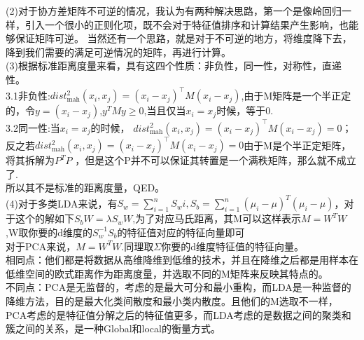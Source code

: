 \documentclass[answers]{exam}  %
\begin{document}
\begin{questions}
\begin{solution}
\begin{parts}
    (2)对于协方差矩阵不可逆的情况，我认为有两种解决思路，第一个是像岭回归一样，引入一个很小的正则化项，既不会对于特征值排序和计算结果产生影响，也能够保证矩阵可逆。
    当然还有一个思路，就是对于不可逆的地方，将维度降下去，降到我们需要的满足可逆情况的矩阵，再进行计算。\\
    
    (3)根据标准距离度量来看，具有这四个性质：非负性，同一性，对称性，直递性。\\
    3.1非负性:$dist_{\text{mah}}^2(x_i, x_j) = (x_i - x_j)^\top M (x_i - x_j)$,由于M矩阵是一个半正定的，令$y = (x_i - x_j)$,$y^T M y \geq 0$,当且仅当$x_i = x_j$时候，等于0.\\
    
    3.2同一性:当$x_i = x_j$的时候， $dist_{\text{mah}}^2(x_i, x_j) = (x_i - x_j)^\top M (x_i - x_j) = 0$；反之若$dist_{\text{mah}}^2(x_i, x_j) = (x_i - x_j)^\top M (x_i - x_j) = 0$由于M是个半正定矩阵，将其拆解为$P^TP$
    ，但是这个P并不可以保证其转置是一个满秩矩阵，那么就不成立了.\\
    
    所以其不是标准的距离度量，QED。\\
    (4)对于多类LDA来说，有$S_w = \sum_{i=1}^{n}S_wi, S_b = \sum_{i=1}^{n} (\mu_i - \mu)^T (\mu_i - \mu)$，对于这个的解如下$S_b W = \lambda S_w W$,为了对应马氏距离，其M可以这样表示$M = W^TW$,W取你要的d维度的$S_w^{-1}S_b$的特征值对应的特征向量即可\\
    对于PCA来说，$M = W^TW$.同理取$\Sigma$你要的d维度特征值的特征向量。\\
    相同点：他们都是将数据从高维降维到低维的技术，并且在降维之后都是用样本在低维空间的欧式距离作为距离度量，并选取不同的M矩阵来反映其特点的。\\
    不同点：PCA是无监督的，考虑的是最大可分和最小重构，而LDA是一种监督的降维方法，目的是最大化类间散度和最小类内散度。且他们的M选取不一样，PCA考虑的是特征值分解之后的特征值更多，而LDA考虑的是数据之间的聚类和簇之间的关系，是一种Global和local的衡量方式。\\

\end{parts}
\end{solution}
\end{questions}
\end{document}
